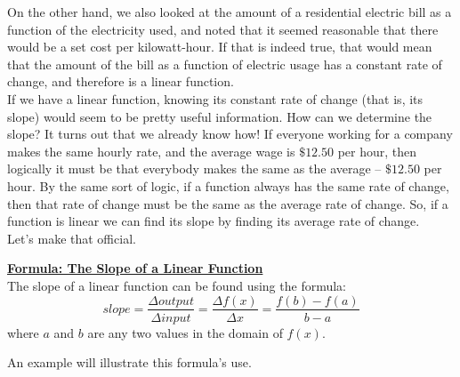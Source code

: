 On the other hand, we also looked at the amount of a residential electric bill as a function of the electricity used, and noted that it seemed reasonable that there would be a set cost per kilowatt-hour. If that is indeed true, that would mean that the amount of the bill as a function of electric usage has a constant rate of change, and therefore is a linear function.\\

If we have a linear function, knowing its constant rate of change (that is, its slope) would seem to be pretty useful information. How can we determine the slope? It turns out that we already know how! If everyone working for a company makes the same hourly rate, and the average wage is $\$12.50$ per hour, then logically it must be that everybody makes the same as the average -- $\$12.50$ per hour. By the same sort of logic, if a function always has the same rate of change, then that rate of change must be the same as the average rate of change. So, if a function is linear we can find its slope by finding its average rate of change.\\

Let’s make that official.

\begin{definition}
	\textbf{\underline{Formula: The Slope of a Linear Function}}\\
	\bigskip
	The slope of a linear function can be found using the formula:\\
	\begin{equation*}
		slope = \frac{\Delta output}{\Delta input} = \frac{\Delta f(x)}{\Delta x}=\frac{f(b)-f(a)}{b-a}
	\end{equation*}
	where $a$ and $b$ are any two values in the domain of $f(x)$.
\end{definition}

An example will illustrate this formula’s use.



